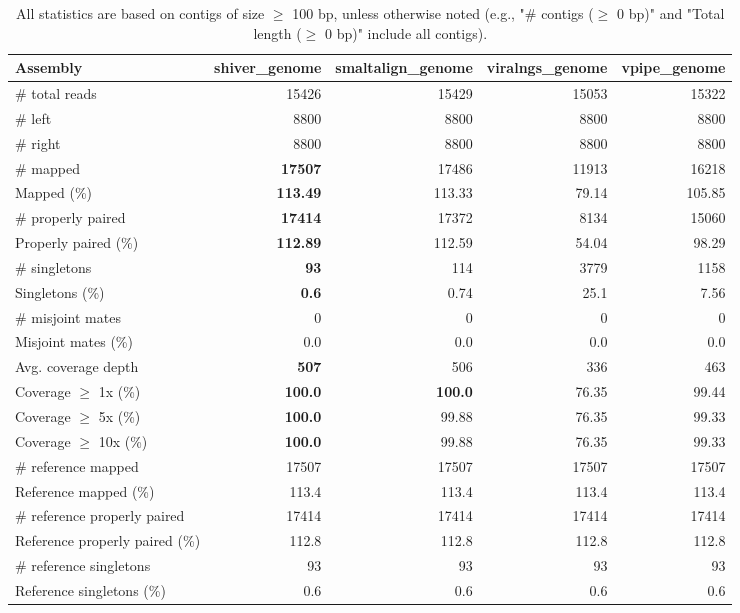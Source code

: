 \documentclass[12pt,a4paper]{article}
\begin{document}
\begin{table}[ht]
\begin{center}
\caption{All statistics are based on contigs of size $\geq$ 100 bp, unless otherwise noted (e.g., "\# contigs ($\geq$ 0 bp)" and "Total length ($\geq$ 0 bp)" include all contigs).}
\begin{tabular}{|l*{4}{|r}|}
\hline
Assembly & shiver\_genome & smaltalign\_genome & viralngs\_genome & vpipe\_genome \\ \hline
\# total reads & 15426 & 15429 & 15053 & 15322 \\ \hline
\# left & 8800 & 8800 & 8800 & 8800 \\ \hline
\# right & 8800 & 8800 & 8800 & 8800 \\ \hline
\# mapped & {\bf 17507} & 17486 & 11913 & 16218 \\ \hline
Mapped (\%) & {\bf 113.49} & 113.33 & 79.14 & 105.85 \\ \hline
\# properly paired & {\bf 17414} & 17372 & 8134 & 15060 \\ \hline
Properly paired (\%) & {\bf 112.89} & 112.59 & 54.04 & 98.29 \\ \hline
\# singletons & {\bf 93} & 114 & 3779 & 1158 \\ \hline
Singletons (\%) & {\bf 0.6} & 0.74 & 25.1 & 7.56 \\ \hline
\# misjoint mates & 0 & 0 & 0 & 0 \\ \hline
Misjoint mates (\%) & 0.0 & 0.0 & 0.0 & 0.0 \\ \hline
Avg. coverage depth & {\bf 507} & 506 & 336 & 463 \\ \hline
Coverage $\geq$ 1x (\%) & {\bf 100.0} & {\bf 100.0} & 76.35 & 99.44 \\ \hline
Coverage $\geq$ 5x (\%) & {\bf 100.0} & 99.88 & 76.35 & 99.33 \\ \hline
Coverage $\geq$ 10x (\%) & {\bf 100.0} & 99.88 & 76.35 & 99.33 \\ \hline
\# reference mapped & 17507 & 17507 & 17507 & 17507 \\ \hline
Reference mapped (\%) & 113.4 & 113.4 & 113.4 & 113.4 \\ \hline
\# reference properly paired & 17414 & 17414 & 17414 & 17414 \\ \hline
Reference properly paired (\%) & 112.8 & 112.8 & 112.8 & 112.8 \\ \hline
\# reference singletons & 93 & 93 & 93 & 93 \\ \hline
Reference singletons (\%) & 0.6 & 0.6 & 0.6 & 0.6 \\ \hline

\end{tabular}
\end{center}
\end{table}
\end{document}
